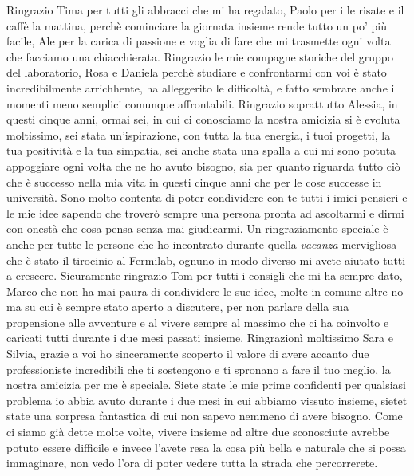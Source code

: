 Ringrazio Tima per tutti gli abbracci che mi ha regalato, Paolo per i le risate e il caffè la mattina, perchè cominciare la giornata insieme rende tutto un po' più facile, Ale per la carica di passione e voglia di fare che mi trasmette ogni volta che facciamo una chiacchierata.
Ringrazio le mie compagne storiche del gruppo del laboratorio, Rosa e Daniela perchè studiare e confrontarmi con voi è stato incredibilmente arrichhente, ha alleggerito le difficoltà, e fatto sembrare anche i momenti meno semplici comunque affrontabili. 
Ringrazio soprattutto Alessia, in questi cinque anni, ormai sei, in cui ci conosciamo la nostra amicizia si è evoluta moltissimo, sei stata un'ispirazione, con tutta la tua energia, i tuoi progetti, la tua positività e la tua simpatia, sei anche stata una spalla a cui mi sono potuta appoggiare ogni volta che ne ho avuto bisogno,
sia per quanto riguarda tutto ciò che è successo nella mia vita in questi cinque anni che per le cose successe in università. Sono molto contenta di poter condividere con te tutti i imiei pensieri e le mie idee sapendo che troverò sempre una persona pronta ad ascoltarmi e dirmi con onestà che cosa pensa senza mai giudicarmi.
Un ringraziamento speciale è anche per tutte le persone che ho incontrato durante quella \textit{vacanza} mervigliosa che è stato il tirocinio al Fermilab, ognuno in modo diverso mi avete aiutato tutti a crescere.
Sicuramente ringrazio Tom per tutti i consigli che mi ha sempre dato, Marco che non ha mai paura di condividere le sue idee, molte in comune altre no ma su cui è sempre stato aperto a discutere, per non parlare della sua propensione alle avventure e al vivere sempre al massimo che ci ha coinvolto e caricati tutti durante i due mesi passati insieme.
Ringrazionì moltissimo Sara e Silvia, grazie a voi ho sinceramente scoperto il valore di avere accanto due professioniste incredibili che ti sostengono e ti spronano a fare il tuo meglio, la nostra amicizia per me è speciale. Siete state le mie prime confidenti per qualsiasi problema io abbia avuto durante i due mesi in cui abbiamo vissuto insieme, sietet state una sorpresa fantastica di cui non sapevo nemmeno di avere bisogno.
Come ci siamo già dette molte volte, vivere insieme ad altre due sconosciute avrebbe potuto essere difficile e invece l'avete resa la cosa più bella e naturale che si possa immaginare, non vedo l'ora di poter vedere tutta la strada che percorrerete.


